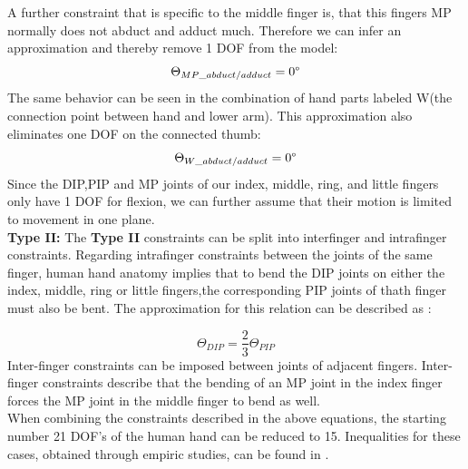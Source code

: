 A further constraint that is specific to the middle finger is, that this fingers MP normally does not abduct and adduct much. Therefore we can infer an approximation and thereby remove 1 DOF from the model:
\begin{equation}
\Theta _{MP\_abduct/adduct}=0\degree
\end{equation}
The same behavior can be seen in the combination of hand parts labeled W(the connection point between hand and lower arm). This approximation also eliminates one DOF on the connected thumb:
\begin{equation}
\Theta _{W\_abduct/adduct}=0\degree
\end{equation}
Since the DIP,PIP and MP joints of our index, middle, ring, and little fingers only have 1 DOF for flexion, we can further assume that their motion is limited to movement in one plane. \\
\textbf{Type II:}
The \textbf{Type II} constraints can be split into interfinger and intrafinger constraints. Regarding intrafinger constraints between the joints of the same finger, human hand anatomy implies that to bend the DIP joints  on  either the index, middle, ring or little fingers,the corresponding PIP joints of thath finger must also be bent. The approximation for this relation\cite{Rijpkema.1991} can be described as :

\begin{equation}
\Theta _{DIP} =\frac{2}{3}\Theta _{PIP}
\end{equation}
Inter-finger constraints can be imposed between joints of adjacent fingers. Inter-finger constraints describe that the bending of an MP joint in the index finger forces the MP joint in the middle finger to bend as well.\\
 When combining the constraints described in the above equations, the starting number 21 DOF's of the human hand can be reduced to 15. Inequalities for these cases, obtained through empiric studies, can be found in \citep{LEE.1995}.\\
